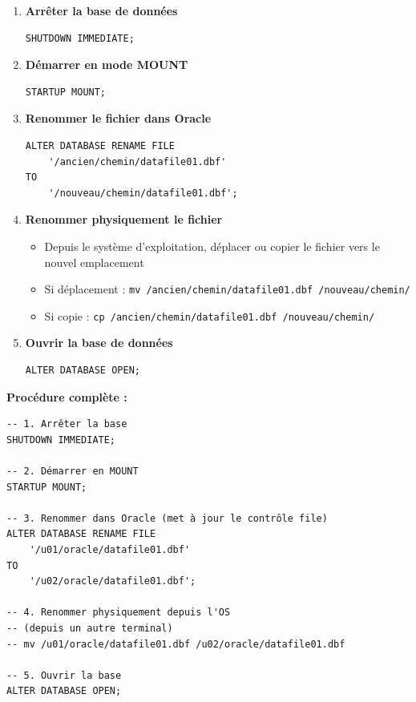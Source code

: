 \documentclass[11pt,a4paper]{article}
\begin{document}
\begin{enumerate}
    \item \textbf{Arrêter la base de données}
    \begin{commandebox}
\begin{lstlisting}
SHUTDOWN IMMEDIATE;
\end{lstlisting}
    \end{commandebox}
    
    \item \textbf{Démarrer en mode MOUNT}
    \begin{commandebox}
\begin{lstlisting}
STARTUP MOUNT;
\end{lstlisting}
    \end{commandebox}
    
    \item \textbf{Renommer le fichier dans Oracle}
    \begin{commandebox}
\begin{lstlisting}
ALTER DATABASE RENAME FILE 
    '/ancien/chemin/datafile01.dbf'
TO 
    '/nouveau/chemin/datafile01.dbf';
\end{lstlisting}
    \end{commandebox}
    
    \item \textbf{Renommer physiquement le fichier}
    \begin{itemize}
        \item Depuis le système d'exploitation, déplacer ou copier le fichier vers le nouvel emplacement
        \item Si déplacement : \texttt{mv /ancien/chemin/datafile01.dbf /nouveau/chemin/}
        \item Si copie : \texttt{cp /ancien/chemin/datafile01.dbf /nouveau/chemin/}
    \end{itemize}
    
    \item \textbf{Ouvrir la base de données}
    \begin{commandebox}
\begin{lstlisting}
ALTER DATABASE OPEN;
\end{lstlisting}
    \end{commandebox}
\end{enumerate}

\textbf{Procédure complète :}

\begin{commandebox}
\begin{lstlisting}
-- 1. Arrêter la base
SHUTDOWN IMMEDIATE;

-- 2. Démarrer en MOUNT
STARTUP MOUNT;

-- 3. Renommer dans Oracle (met à jour le contrôle file)
ALTER DATABASE RENAME FILE 
    '/u01/oracle/datafile01.dbf'
TO 
    '/u02/oracle/datafile01.dbf';

-- 4. Renommer physiquement depuis l'OS
-- (depuis un autre terminal)
-- mv /u01/oracle/datafile01.dbf /u02/oracle/datafile01.dbf

-- 5. Ouvrir la base
ALTER DATABASE OPEN;
\end{lstlisting}
\end{commandebox}
\end{document}
